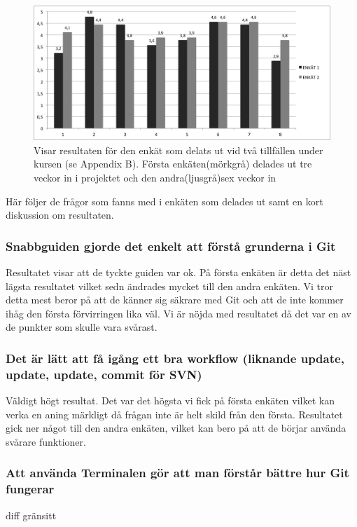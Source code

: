 \begin{figure}[htb!]\centering\includegraphics[width=1.0\textwidth]{EnkatResultat.png}\caption{Visar resultaten för den enkät som delats ut vid två tillfällen under kursen (se Appendix B). Första enkäten(mörkgrå) delades ut tre veckor in i projektet och den andra(ljusgrå)sex veckor in}\label{fig:enkat}\end{figure}

Här följer de frågor som fanns med i enkäten som delades ut samt en kort diskussion om resultaten.

\subsubsection{Snabbguiden gjorde det enkelt att förstå grunderna i Git}

Resultatet visar att de tyckte guiden var ok. På första enkäten är detta det näst lägsta resultatet vilket sedn ändrades mycket till den andra enkäten. Vi tror detta mest beror på att de känner sig säkrare med Git och att de inte kommer ihåg den första förvirringen lika väl. Vi är nöjda med resultatet då det var en av de punkter som skulle vara svårast.

\subsubsection{Det är lätt att få igång ett bra workflow (liknande update, update, update, commit för SVN)}

Väldigt högt resultat. Det var det högsta vi fick på första enkäten vilket kan verka en aning märkligt då frågan inte är helt skild från den första. Resultatet gick ner något till den andra enkäten, vilket kan bero på att de börjar använda svårare funktioner. 

\subsubsection{Att använda Terminalen gör att man förstår bättre hur Git fungerar}
diff gränsitt

